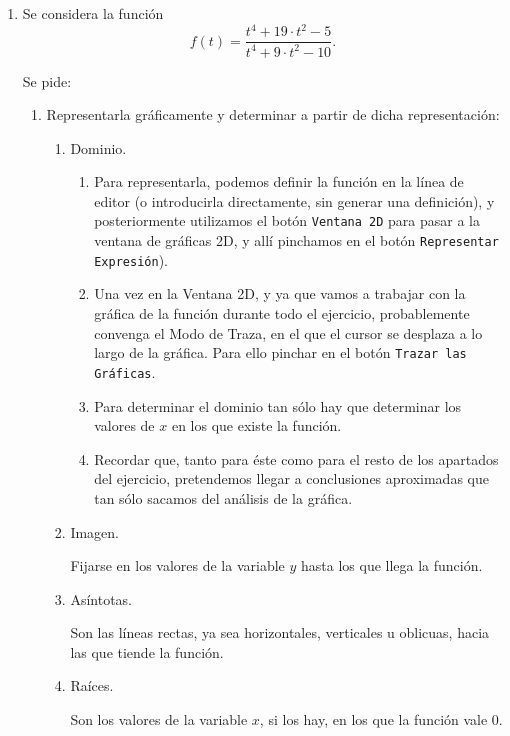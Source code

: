 \begin{enumerate}[leftmargin=*]
\item Se considera la función
\[
f(t)=\frac{t^{4} +19\cdot t^{2} - 5}{t^{4} +9\cdot t^{2} - 10}.
\]

Se pide: 
\begin{enumerate}
\item Representarla gráficamente y determinar a partir de dicha representación:

\begin{enumerate}
\item  Dominio.
\begin{indicacion}
\begin{enumerate}
\item Para representarla, podemos definir la función en la línea de editor (o introducirla directamente, sin generar una definición), y
posteriormente utilizamos el botón \texttt{Ventana 2D} para pasar a la ventana de gráficas 2D, y allí pinchamos en el botón
\texttt{Representar Expresión}).
\item Una vez en la Ventana 2D, y ya que vamos a trabajar con la gráfica de la función durante todo el ejercicio, probablemente convenga el
Modo de Traza, en el que el cursor se desplaza a lo largo de la gráfica. Para ello pinchar en el botón \texttt{Trazar las Gráficas}.
\item Para determinar el dominio tan sólo hay que determinar los valores de $x$ en los que existe la función.
\item Recordar que, tanto para éste como para el resto de los apartados del ejercicio, pretendemos llegar a conclusiones aproximadas que tan
sólo sacamos del análisis de la gráfica.
\end{enumerate}
\end{indicacion}

\item  Imagen.
\begin{indicacion}
Fijarse en los valores de la variable $y$ hasta los que llega la función.
\end{indicacion}

\item  Asíntotas.
\begin{indicacion}
Son las líneas rectas, ya sea horizontales, verticales u oblicuas, hacia las que tiende la función.
\end{indicacion}

\item  Raíces.
\begin{indicacion}
Son los valores de la variable $x$, si los hay, en los que la función vale 0.
\end{indicacion}


\end{enumerate}
\end{enumerate}
\end{enumerate}
